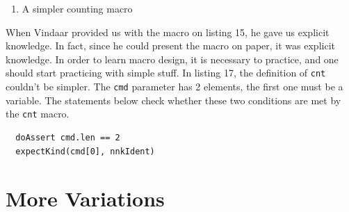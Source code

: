 \documentclass[
  12pt,
]{book}
\providecommand{\tightlist}{%
  \setlength{\itemsep}{0pt}\setlength{\parskip}{0pt}}
\begin{document}
\begin{enumerate}
\def\labelenumi{(\arabic{enumi})}
\setcounter{enumi}{16}
\tightlist
\item
  A simpler counting macro
\end{enumerate}

When Vindaar provided us with the macro on listing 15, he gave us
explicit knowledge. In fact, since he could present the macro on paper,
it was explicit knowledge. In order to learn macro design, it is
necessary to practice, and one should start practicing with simple
stuff. In listing 17, the definition of \texttt{cnt} couldn't be
simpler. The \texttt{cmd} parameter has 2 elements, the first one must
be a variable. The statements below check whether these two conditions
are met by the \texttt{cnt} macro.

\begin{verbatim}
  doAssert cmd.len == 2
  expectKind(cmd[0], nnkIdent)
\end{verbatim}

\chapter{More Variations}\label{more-variations}
\end{document}
